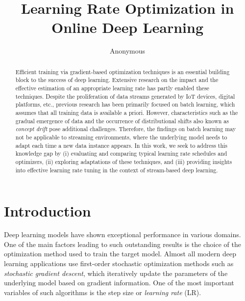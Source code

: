 \documentclass[runningheads]{llncs}
\begin{document}
%
\title{Learning Rate Optimization in Online Deep Learning}
%
%
\author{Anonymous}
%
%
%

\maketitle
%
\begin{abstract}
	Efficient training via gradient-based optimization techniques is an essential building block to the success of deep learning. Extensive research on the impact and the effective estimation of an appropriate learning rate has partly enabled these techniques. Despite the proliferation of data streams generated by IoT devices, digital platforms, etc., previous research has been primarily focused on batch learning, which assumes that all training data is available a priori. However, characteristics such as the gradual emergence of data and the occurrence of distributional shifts also known as \textit{concept drift} pose additional challenges. Therefore, the findings on batch learning may not be applicable to streaming environments, where the underlying model needs to adapt each time a new data instance appears. In this work, we seek to address this knowledge gap by (i) evaluating and comparing typical learning rate schedules and optimizers, (ii) exploring adaptations of these techniques, and (iii) providing insights into effective learning rate tuning in the context of stream-based deep learning.

\end{abstract}
%
%
%
\section{Introduction}
Deep learning models have shown exceptional performance in various domains.
One of the main factors leading to such outstanding results is the choice of the optimization method used to train the target model.
Almost all modern deep learning applications use first-order stochastic optimization methods such as \textit{stochastic gradient descent}, which iteratively update the parameters of the underlying model based on gradient information.
One of the most important variables of such algorithms is the step size or \textit{learning rate} (LR).
\end{document}
